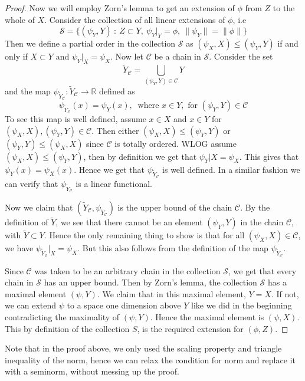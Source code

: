 \begin{proof}
  Now we will employ Zorn's lemma to get an extension of $\phi$ from $Z$ to the whole of $X$. Consider the collection of all linear extensions of $\phi$, i.e \[ \mathcal{S} = \Big \{ (\psi_Y, Y) \ : \ Z \subset Y, \ \psi_Y|_Y = \phi, \ \| \psi_Y\| = \|\phi\| \Big \} \]
  Then we define a partial order in the collection $\mathcal{S}$ as $(\psi_X, X) \le (\psi_Y, Y)$ if and only if $X \subset Y$ and $\psi_Y|_X = \psi_X$. Now let $\mathscr{C}$ be a chain in $\mathcal{S}$. Consider the set \[
    \tilde{Y}_\mathscr{C} = \bigcup_{(\psi_Y, Y) \in \mathscr{C}} Y
  \]
  and the map $\psi_{\tilde{Y}_\mathscr{C}}: \tilde{Y}_{\mathscr{C}} \to \mathbb{R}$ defined as \[
    \psi_{\tilde{Y}_\mathscr{C}}(x) = \psi_Y(x), \ \textrm{ where } x \in Y, \textrm{ for } (\psi_Y, Y) \in \mathscr{C}
  \]
  To see this map is well defined, assume $x \in X$ and $x \in Y$ for $(\psi_X, X), (\psi_Y, Y) \in \mathscr{C}$. Then either $(\psi_X, X) \le (\psi_Y, Y)$ or $(\psi_Y, Y) \le (\psi_X, X)$ since $\mathscr{C}$ is totally ordered. WLOG assume $(\psi_X, X) \le (\psi_Y, Y)$, then by definition we get that $\psi_Y|X = \psi_X$. This gives that $\psi_Y(x) = \psi_X(x)$. Hence we get that $\psi_{\tilde{Y}_{\mathscr{C}}}$ is well defined. In a similar fashion we can verify that $\psi_{\tilde{Y}_{\mathscr{C}}}$ is a linear functional.

  Now we claim that $(\tilde{Y}_{\mathscr{C}}, \psi_{\tilde{Y}_\mathscr{C}})$ is the upper bound of the chain $\mathscr{C}$. By the definition of $\tilde{Y}$, we see that there cannot be an element $(\psi_Y, Y)$ in the chain $\mathscr{ C}$, with $\tilde{Y} \subset Y$. Hence the only remaining thing to show is that for all $(\psi_X, X) \in \mathscr{ C}$, we have $\psi_{\tilde{Y}_\mathscr{C}}|_X = \psi_X$. But this also follows from the definition of the map $\psi_{\tilde{Y}_\mathscr{C}}$.

  Since $\mathscr{C}$ was taken to be an arbitrary chain in the collection $\mathcal{S}$, we get that every chain in $\mathcal{S}$ has an upper bound. Then by Zorn's lemma, the collection $\mathcal{S}$ has a maximal element $(\psi, Y)$. We claim that in this maximal element, $Y = X$. If not, we can extend $\psi$ to a space one dimension above $Y$ like we did in the beginning contradicting the maximality of $(\psi, Y)$. Hence the maximal element is $(\psi, X)$. This by definition of the collection $S$, is the required extension for $(\phi, Z)$.
\end{proof}
\begin{remark}
   Note that in the proof above, we only used the scaling property and triangle inequality of the norm, hence we can relax the condition for norm and replace it with a seminorm, without messing up the proof.
\end{remark}

